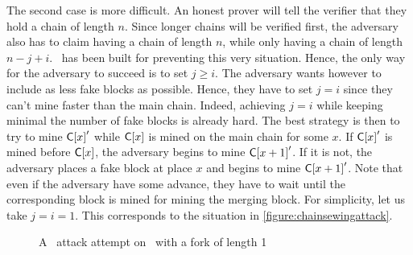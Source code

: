       The second case is more difficult. An honest prover will tell the verifier that they hold a chain of length \(n\). Since longer chains will be verified first, the adversary also has to claim having a chain of length \(n\), while only having a chain of length \(n-j+i\). \FC\ has been built for preventing this very situation. Hence, the only way for the adversary to succeed is to set \(j\geqslant i\). The adversary wants however to include as less fake blocks as possible. Hence, they have to set \(j=i\) since they can't mine faster than the main chain. Indeed, achieving \(j=i\) while keeping minimal the number of fake blocks is already hard.  The best strategy is then to try to mine \(\mathsf{C[}x\mathsf{]}'\) while \(\mathsf{C[}x\mathsf{]}\) is mined on the main chain for some \(x\). If \(\mathsf{C[}x\mathsf{]}'\) is mined before \(\mathsf{C[}x\mathsf{]}\), the adversary begins to mine \(\mathsf{C[}x+1\mathsf{]}'\). If it is not, the adversary places a fake block at place \(x\) and begins to mine \(\mathsf{C[}x+1\mathsf{]}'\). Note that even if the adversary have some advance, they have to wait until the corresponding block is mined for mining the merging block. For simplicity, let us take \(j=i=1\). This corresponds to the situation in \autoref{figure:chainsewingattack}.
      
      \begin{figure}[ht]
        \centering
          \caption{A \cs\ attack attempt on \FC\ with a fork of length 1}
          \label{figure:chainsewingattack}
        \end{figure}
        
